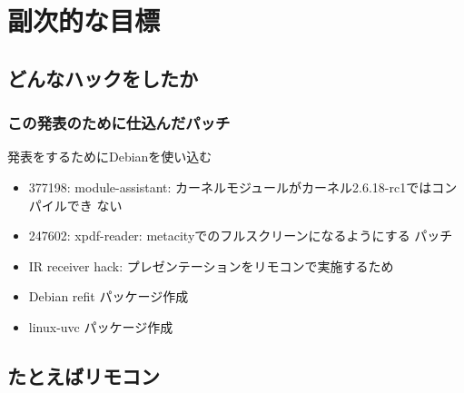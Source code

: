 \documentclass[cjk,dvipdfmx]{beamer}
\begin{document}
\section{副次的な目標}

\subsection{どんなハックをしたか}

\begin{frame}
 \frametitle{この発表のために仕込んだパッチ}

 発表をするためにDebianを使い込む

 \begin{itemize}[<+->]
  \item 377198: module-assistant: カーネルモジュールがカーネル2.6.18-rc1ではコンパイルでき
	ない
  \item 247602: xpdf-reader: metacityでのフルスクリーンになるようにする
	パッチ
  \item IR receiver hack: プレゼンテーションをリモコンで実施するため
  \item Debian refit パッケージ作成
  \item linux-uvc パッケージ作成
 \end{itemize}
\end{frame}

\subsection{たとえばリモコン}
\end{document}
